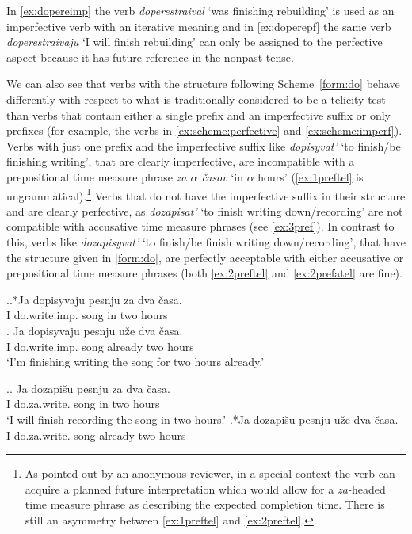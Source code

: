 In \ref{ex:dopereimp} the verb \textit{doperestraival} `was finishing rebuilding' is used as an imperfective verb with an iterative meaning and in \ref{ex:doperepf} the same verb \textit{doperestraivaju} `I will finish rebuilding' can only be assigned to the perfective aspect because it has future reference in the nonpast tense.

We can also see that verbs with the structure following Scheme~\ref{form:do} behave differently with respect to what is traditionally considered to be a telicity test than verbs that contain either a single prefix and an imperfective suffix or only prefixes (for example, the verbs in \ref{ex:scheme:perfective} and \ref{ex:scheme:imperf}). Verbs with just one prefix and the imperfective suffix like \textit{dopisyvat'} `to finish/be finishing writing', that are clearly imperfective, are incompatible with a prepositional time measure phrase \textit{za $\alpha$ \v{c}asov} `in $\alpha$ hours' (\ref{ex:1preftel} is ungrammatical).\footnote{As pointed out by an anonymous reviewer, in a special context the verb can acquire a planned future interpretation which would allow for a \textit{za-}headed time measure phrase as describing the expected completion time. There is still an asymmetry between \ref{ex:1preftel} and \ref{ex:2preftel}.} Verbs that do not have the imperfective suffix in their structure and are clearly perfective, as \textit{dozapisat'} `to finish writing down/recording' are not compatible with accusative time measure phrases (see \ref{ex:3pref}). In contrast to this, verbs like \textit{dozapisyvat'} `to finish/be finish writing down/recording', that have the structure given in \ref{form:do}, are perfectly acceptable with either accusative or prepositional time measure phrases (both \ref{ex:2preftel} and \ref{ex:2prefatel} are fine).

\ex.\label{ex:1pref}\ag.*Ja dopisyvaju pesnju za dva \v{c}asa.\label{ex:1preftel}\\
I do.write.imp. song in two hours\\
\bg. \label{ex:1prefatel}Ja dopisyvaju pesnju u\v{z}e dva \v{c}asa.\\
I do.write.imp. song already two hours\\
\vspace{0.5em}
`I'm finishing writing the song for two hours already.'

\ex.\label{ex:3pref}\ag. \label{ex:3preftel}Ja dozapi\v{s}u pesnju za dva \v{c}asa.\\
I do.za.write. song in two hours\\
\vspace{0.5em}
`I will finish recording the song in two hours.'
\bg.*Ja dozapi\v{s}u pesnju u\v{z}e dva \v{c}asa.\label{ex:3prefatel}\\
I do.za.write. song already two hours\\

